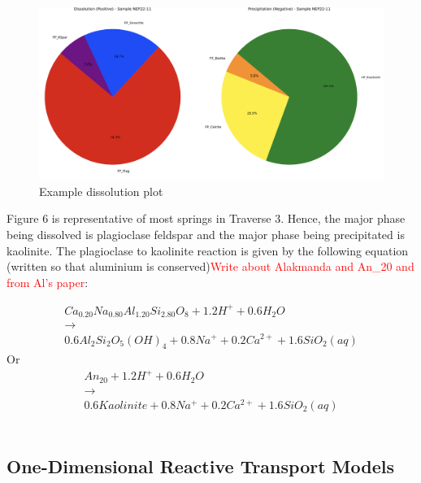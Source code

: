 \begin{figure}[h]
    \centering
    \includegraphics[width=\textwidth]{Stoichiometric_eg.png}
    \caption{Example dissolution plot}
    \label{fig:discussion6}
\end{figure}

\FloatBarrier

Figure 6 is representative of most springs in Traverse 3. Hence, the major phase being dissolved is plagioclase feldspar and the major phase being precipitated is kaolinite. The plagioclase to kaolinite reaction is given by the following equation (written so that aluminium is conserved)\textcolor{red}{Write about Alakmanda and An\_20 and from Al's paper}:

\begin{equation}
    \begin{matrix}
Ca_{0.20}Na_{0.80}Al_{1.20}Si_{2.80}O_{8} + 1.2H^{+} + 0.6 H_{2}O \\ \rightarrow\\ 0.6 Al_{2}Si_{2}O_{5}(OH)_{4} + 0.8 Na^{+} + 0.2 Ca^{2+} + 1.6 SiO_{2}(aq)
    \end{matrix}
\end{equation}
\quad Or
\begin{equation}
    \begin{matrix}
An_{20} + 1.2 H^{+} + 0.6 H_{2}O\\ \rightarrow\\ 0.6 Kaolinite + 0.8 Na^{+} + 0.2 Ca^{2+} + 1.6 SiO_{2}(aq)
\end{matrix}
\label{eq:10}
\end{equation}\\



\newpage


\subsection{One-Dimensional Reactive Transport Models}

